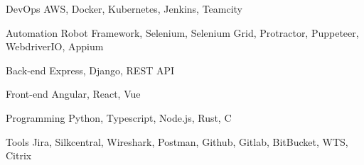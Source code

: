 

\begin{cvskills}

  \cvskill
    {DevOps} %
    {AWS, Docker, Kubernetes, Jenkins, Teamcity} %
    
    \cvskill
    {Automation} %
    {Robot Framework, Selenium, Selenium Grid, Protractor, Puppeteer, WebdriverIO, Appium } %

  \cvskill
    {Back-end} %
    {Express, Django, REST API} %

  \cvskill
    {Front-end} %
    {Angular, React, Vue} %

  \cvskill
    {Programming} %
    {Python, Typescript, Node.js, Rust, C} %
    
  \cvskill
	{Tools} %
	{Jira, Silkcentral, Wireshark, Postman, Github, Gitlab, BitBucket, WTS, Citrix } %

\end{cvskills}
